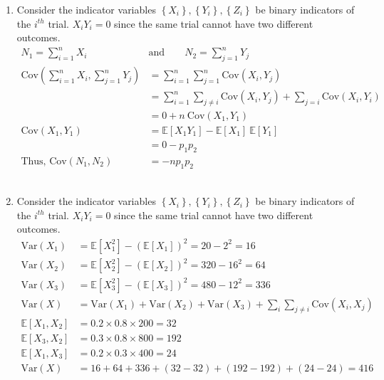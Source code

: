 \begin{enumerate}
	
	\item Consider the indicator variables $ \left\{X_i\right\}, \left\{Y_i\right\}, \left\{Z_i\right\} $ be binary indicators of the $ i^{th} $ trial. $ X_i Y_i  = 0$ since the same trial cannot have two different outcomes.\\
	
		\begin{align}
			N_1 = \sum\limits_{i = 1}^{n} X_i \qquad &\text{and} \qquad N_2 = \sum\limits_{j = 1}^{n} Y_j\qquad   \nonumber \\
			\mathrm{Cov}\left(\sum\limits_{i = 1}^{n} X_i, \sum\limits_{j = 1}^{n} Y_j\right) &= \sum\limits_{i = 1}^{n} \sum\limits_{j = 1}^{n} \mathrm{Cov}(X_i, Y_j) \nonumber \\
			&= \sum\limits_{i = 1}^{n} \sum\limits_{j \neq i} \mathrm{Cov}(X_i, Y_j) + \sum\limits_{j = i} \mathrm{Cov}(X_i, Y_i) \nonumber \\
			&= 0 + n\ \mathrm{Cov}(X_1, Y_1) \\
			\mathrm{Cov}(X_1, Y_1) &= \mathbb{E}[X_1 Y_1] - \mathbb{E}[X_1]\ \mathbb{E}[Y_1] \nonumber \\
			&= 0 - p_1 p_2 \\
			\text{Thus, } \mathrm{Cov}(N_1, N_2) &= - n p_1 p_2
		\end{align} \\
	
	
	\item Consider the indicator variables $ \left\{X_i\right\}, \left\{Y_i\right\}, \left\{Z_i\right\} $ be binary indicators of the $ i^{th} $ trial. $ X_i Y_i  = 0$ since the same trial cannot have two different outcomes.\\
	
		\begin{align}
			\mathrm{Var}(X_1) &= \mathbb{E}[X_1^2]- (\mathbb{E}[X_1])^2 = 20 - 2^2 = 16 \nonumber \\
			\mathrm{Var}(X_2) &= \mathbb{E}[X_2^2]- (\mathbb{E}[X_2])^2 = 320 - 16^2 = 64 \nonumber \\
			\mathrm{Var}(X_3) &= \mathbb{E}[X_3^2]- (\mathbb{E}[X_3])^2 = 480 - 12^2 = 336 \nonumber \\
			\mathrm{Var}(X) &= \mathrm{Var}(X_1) + \mathrm{Var}(X_2) + \mathrm{Var}(X_3) + \sum\limits_{i} \sum\limits_{j \neq i} \mathrm{Cov}(X_i, X_j)  \\
			\mathbb{E}[X_1, X_2] &= 0.2 \times 0.8 \times 200 = 32 \nonumber \\
			\mathbb{E}[X_3, X_2] &= 0.3 \times 0.8 \times 800 = 192 \nonumber \\
			\mathbb{E}[X_1, X_3] &= 0.2 \times 0.3 \times 400 = 24 \nonumber \\
			\mathrm{Var}(X) &= 16 + 64 + 336 + (32 - 32) + (192 - 192) + (24 - 24) = 416
		\end{align} \\
	

\end{enumerate}
